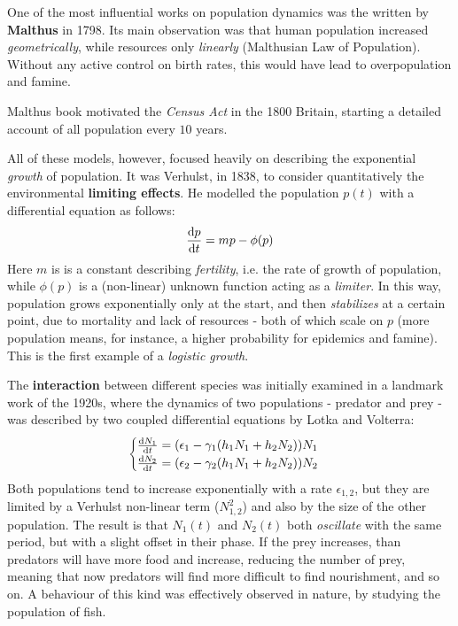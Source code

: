 \documentclass[../../main.tex]{subfiles}
\begin{document}
\medskip

One of the most influential works on population dynamics was the  written by \textbf{Malthus} in 1798. Its main observation was that human population increased \textit{geometrically}, while resources only \textit{linearly} (Malthusian Law of Population). Without any active control on birth rates, this would have lead to overpopulation and famine. 

Malthus book motivated the \textit{Census Act} in the 1800 Britain, starting a detailed account of all population every $10$ years. 

\medskip

All of these models, however, focused heavily on describing the exponential \textit{growth} of population. It was Verhulst, in 1838, to consider quantitatively the environmental \textbf{limiting effects}. He modelled the population $p(t)$ with a differential equation as follows:
\begin{align*}
    \dv{p}{t} = mp - \phi(p)
\end{align*}
Here $m$ is is a constant describing \textit{fertility}, i.e. the rate of growth of population, while $\phi(p)$ is a (non-linear) unknown function acting as a \textit{limiter}. In this way, population grows exponentially only at the start, and then \textit{stabilizes} at a certain point, due to mortality and lack of resources - both of which scale on $p$ (more population means, for instance, a higher probability for epidemics and famine). This is the first example of a \textit{logistic growth}.

\medskip

The \textbf{interaction} between different species was initially examined in a landmark work of the 1920s, where the dynamics of two populations - predator and prey - was described by two coupled differential equations by Lotka and Volterra:
\begin{align*}
    \begin{cases}
        \dv{N_1}{t} = (\epsilon_1 - \gamma_1(h_1 N_1 + h_2 N_2))N_1\\
        \dv{N_2}{t} = (\epsilon_2 - \gamma_2(h_1 N_1 + h_2 N_2))N_2
    \end{cases}
\end{align*}
Both populations tend to increase exponentially with a rate $\epsilon_{1,2}$, but they are limited by a Verhulst non-linear term ($N_{1,2}^2$) and also by the size of the other population. %
The result is that $N_1(t)$ and $N_2(t)$ both \textit{oscillate} with the same period, but with a slight offset in their phase. If the prey increases, than predators will have more food and increase, reducing the number of prey, meaning that now predators will find more difficult to find nourishment, and so on. A behaviour of this kind was effectively observed in nature, by studying the population of fish.
\end{document}
